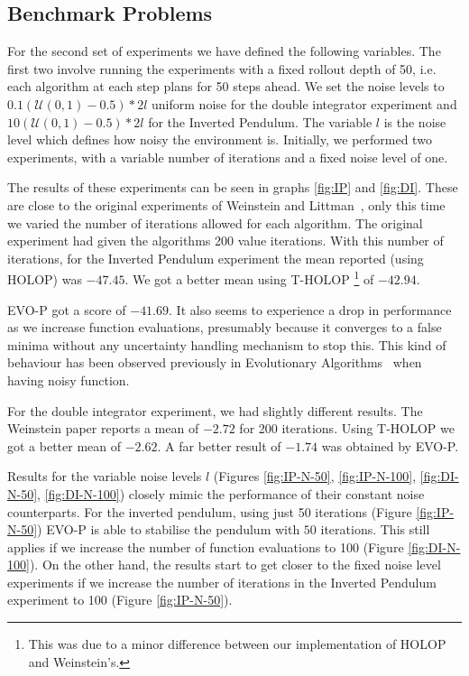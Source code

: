 \documentclass[conference]{IEEEtran}
\begin{document}
\subsection{Benchmark Problems}


For the second set of experiments we have defined the following variables. The first two involve running the experiments with a fixed rollout depth of 50, i.e. each algorithm at each step plans for 50 steps ahead. We set the noise levels to $0.1 (\mathcal{U}(0,1)-0.5)*2 l$ uniform noise for the double integrator experiment and $10 (\mathcal{U}(0,1)-0.5)*2 l$  for the Inverted Pendulum.  The variable $l$ is the noise level which defines how noisy the environment is. Initially, we performed two experiments, with a variable number of iterations and a fixed noise level of one. 





The results of these experiments can be seen in graphs  \ref{fig:IP} and \ref{fig:DI}. These are close to the original experiments of Weinstein and Littman~\cite{weinstein2012bandit}, only this time we varied the number
of iterations allowed for each algorithm. The original experiment had given the algorithms 200 value iterations. With this number of iterations, for the Inverted Pendulum experiment the mean reported (using HOLOP) was $-47.45$. We got a better mean using T-HOLOP
\footnote{This was due to a minor difference between our implementation of HOLOP and Weinstein's.}
 of $-42.94$.

 EVO-P got a score of $-41.69$. It also seems to experience a drop in performance as we increase function evaluations, presumably because it converges to a false minima without any uncertainty handling mechanism to stop this. This kind of behaviour has been observed previously in Evolutionary Algorithms~\cite{hansen2009tec} when having noisy function.

For the double integrator experiment, we had slightly different results. The Weinstein paper reports a mean of $-2.72$ for 200 iterations. Using T-HOLOP we got a better mean of $-2.62$. A far better result of $-1.74$ was obtained by EVO-P. 


Results for the variable noise levels $l$ (Figures \ref{fig:IP-N-50}, \ref{fig:IP-N-100}, \ref{fig:DI-N-50}, \ref{fig:DI-N-100}) closely mimic the performance of their constant noise counterparts. For the inverted pendulum, using just 50 iterations (Figure \ref{fig:IP-N-50}) EVO-P is able to stabilise the pendulum with $50$ iterations. This still applies if we increase the number of function evaluations to 100 (Figure \ref{fig:DI-N-100}). On the other hand, the results start to get closer to the fixed noise level experiments if we increase the number of iterations in the Inverted Pendulum experiment to 100 (Figure \ref{fig:IP-N-50}).
\end{document}
